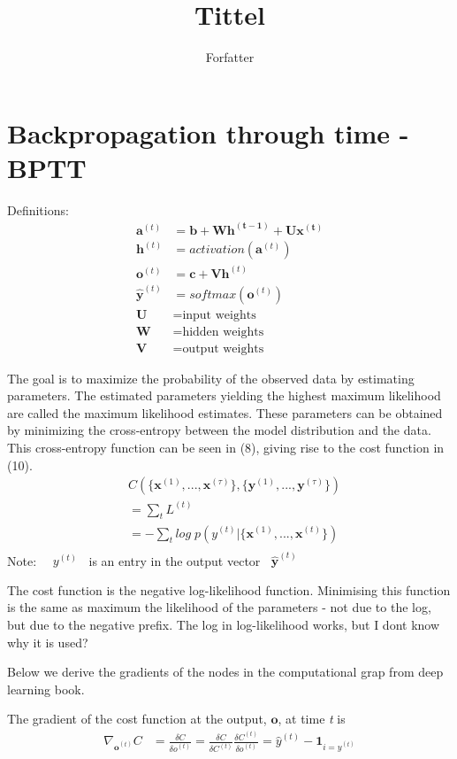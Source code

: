 \documentclass[12pt]{article}
\title{Tittel}
\author{Forfatter}
\date{}
\begin{document}
\maketitle

\section{Backpropagation through time - BPTT}


Definitions:
\begin{align}
    \mathbf{a}^{(t)} &= \mathbf{b + Wh^{(t-1)} + Ux^{(t)}} \\
    \mathbf{h}^{(t)} &= activation(\mathbf{a}^{(t)})\\
    \mathbf{o}^{(t)} &= \mathbf{c + Vh}^{(t)} \\
    \mathbf{\hat{y}}^{(t)} &= softmax(\mathbf{o}^{(t)}) \\
    \mathbf{U} &= \text{input weights} \\
    \mathbf{W} &= \text{hidden weights} \\
    \mathbf{V} &= \text{output weights}
\end{align}


The goal is to maximize the probability of the observed data by estimating parameters. The estimated parameters yielding the highest maximum likelihood are called the maximum likelihood estimates. These parameters can be obtained by minimizing the cross-entropy between the model distribution and the data. %
This cross-entropy function can be seen in (8), giving rise to the cost function in (10).
\begin{align}
    &C\left(\{\mathbf{x}^{(1)},...,\mathbf{x}^{(\tau)}\}, \{\mathbf{y}^{(1)},...,\mathbf{y}^{(\tau)}\}\right) \\
    &= \sum_t L^{(t)} \\
    &= -\sum_t log\;p\left(y^{(t)}|\{\mathbf{x}^{(1)},...,\mathbf{x}^{(t)}\}\right) \\
\end{align}
Note: $\quad y^{(t)} \;\;$ is an entry in the output vector $\;\; \mathbf{\hat{y}}^{(t)}$ \par
The cost function is the negative log-likelihood function. Minimising this function is the same as maximum the likelihood of the parameters - not due to the log, but due to the negative prefix. The log in log-likelihood works, but I dont know why it is used? \par
Below we derive the gradients of the nodes in the computational grap from deep learning book.
\par
The gradient of the cost function at the output, $\mathbf{o}$, at time \textit{t} is
\begin{align}
    \nabla_{\mathbf{o}^{(t)}} C &= \frac{\delta C}{\delta o^{(t)}}
    = \frac{\delta C}{\delta C^{(t)}}\frac{\delta C^{(t)}}{\delta o^{(t)}}
    = \hat{y}^{(t)} - \mathbf{1}_{i=y^{(t)}}
\end{align}
\end{document}
